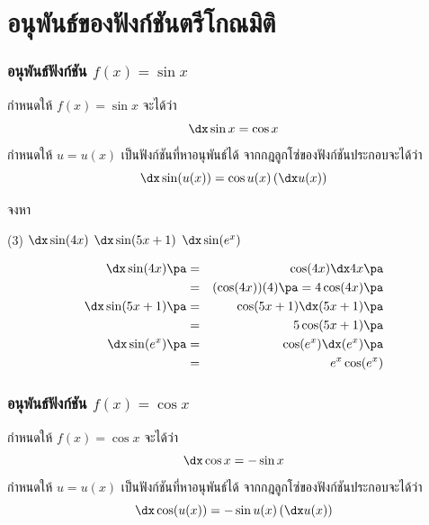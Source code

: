 \section[ตรีโกณมิติ]{อนุพันธ์ของฟังก์ชันตรีโกณมิติ}
\frame{\sectionpage}

\begin{frame}
\frametitle{อนุพันธ์ฟังก์ชัน $f(x) = \sin x$}
\begin{thm}{}{}
กำหนดให้ $f(x) = \sin x$ \pa จะได้ว่า
\begin{equation} 
\dx \sin x = \cos x
\end{equation}
\pa กำหนดให้ $u = u(x)$ เป็นฟังก์ชันที่หาอนุพันธ์ได้ จากกฎลูกโซ่ของฟังก์ชันประกอบจะได้ว่า \pa
\[ \dx \sin (u(x)) = \cos u(x) \left( \dx u(x)\right)\]
\end{thm}
\end{frame}


\begin{frame}[t]
\begin{ex}
จงหา
\begin{tasks}(3)
\task $\dx \sin (4x)$
\task $\dx \sin (5x+1)$ 
\task $\dx \sin (e^x)$
\end{tasks}
\end{ex}
\begin{sol}
\begin{eqnarray*}
\dx \sin (4x) \pa &=& \cos (4x) \dx 4x \pa \\
&=& (\cos (4x))(4) \pa = 4 \cos (4x) \pa \\
\dx \sin (5x+1) \pa &=& \cos (5x+1) \dx (5x+1) \pa \\
&=& 5 \cos (5x+1) \pa \\
\dx \sin (e^x) \pa &=& \cos (e^x) \dx (e^x) \pa \\
&=& e^x \cos (e^x)
\end{eqnarray*}
\end{sol}
\end{frame}

\begin{frame}
\frametitle{อนุพันธ์ฟังก์ชัน $f(x) = \cos x$}
\begin{thm}{}{}
กำหนดให้ $f(x) = \cos x$ \pa จะได้ว่า
\begin{equation}
\dx \cos x = -\sin x
\end{equation} 
\pa กำหนดให้ $u = u(x)$ เป็นฟังก์ชันที่หาอนุพันธ์ได้ จากกฎลูกโซ่ของฟังก์ชันประกอบจะได้ว่า
\[ \dx \cos (u(x)) = -\sin u(x) \left( \dx u(x) \right)\]
\end{thm}
\end{frame}


